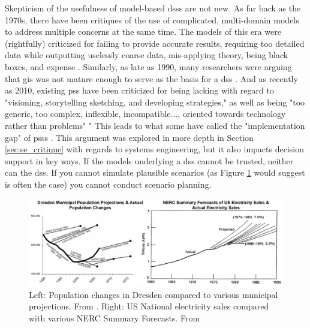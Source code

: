Skepticism of the usefulness of model-based \acp{dss} are not new. As far back as the 1970s, there have been critiques of the use of complicated, multi-domain models to address multiple concerns at the same time. The models of this era were (rightfully) criticized for failing to provide accurate results, requiring too detailed data while outputting uselessly coarse data, mis-applying theory, being black boxes, and expense \cite{leejrRequiemLargeScaleModels1973}. Similarly, as late as 1990, many researchers were arguing that \ac{gis} was not mature enough to serve as the basis for a \ac{dss} \cite{jankowskiIntegratingGeographicalInformation1995}. And as recently as 2010, existing \ac{pss} have been criticized for being lacking with regard to "visioning, storytelling sketching, and developing strategies," as well as being "too generic, too complex, inflexible, incompatible..., oriented towards technology rather than problems" \cite{brommelstroetPlanningSupportSystems2010}" This leads to what some have called the "implementation gap" of \acp{pss} \cite{BottlenecksBlockingWidespread}. This argument was explored in more depth in Section \ref{sec:se_critique} with regards to systems engineering, but it also impacts decision support in key ways. If the models underlying a \ac{dss} cannot be trusted, neither can the \ac{dss}. If you cannot simulate plausible scenarios (as Figure \ref{fig:projections} would suggest is often the case) you cannot conduct scenario planning.  

\begin{figure}[!htb]
	\centering
	\includegraphics[scale=0.32]{Figures/chap2/projections.jpg}
	\caption[Projections compared to actual changes]{Left: Population changes in Dresden compared to various municipal projections. From \cite{wiechmannErrorsExpectedAligning2008}. Right: US National electricity sales compared with various NERC Summary Forecasts. From \cite{nelsonNERCFanRetrospective1985}}
	\label{fig:projections}
\end{figure}

